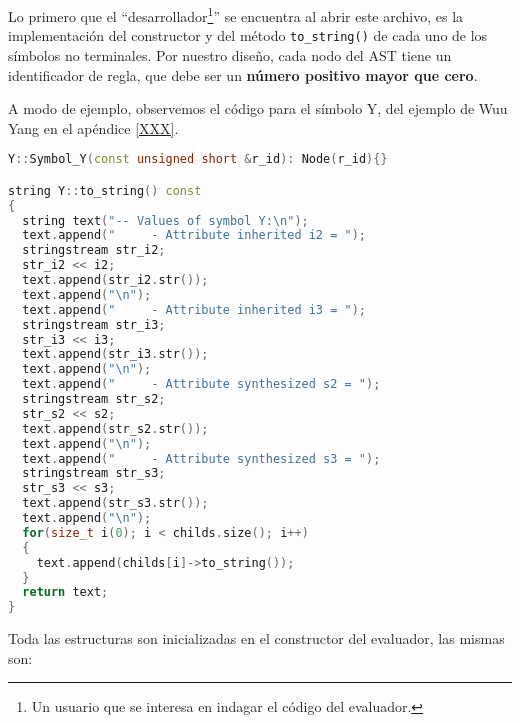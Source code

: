 Lo primero que el ``desarrollador\footnote{Un usuario que se interesa en indagar el código del evaluador.}'' se encuentra al abrir este archivo, es la implementación del constructor y del método \texttt{to\_string()} de cada uno de los símbolos no terminales. Por nuestro diseño, cada nodo del AST tiene un identificador de regla, que debe ser un \textbf{número positivo mayor que cero}.

A modo de ejemplo, observemos el código para el símbolo Y, del ejemplo de Wuu Yang en el apéndice \ref{XXX}.

\begin{lstlisting}[language=C++, basicstyle=\scriptsize, columns=fullflexible, linewidth=9cm]
Y::Symbol_Y(const unsigned short &r_id): Node(r_id){}

string Y::to_string() const
{
  string text("-- Values of symbol Y:\n");
  text.append("     - Attribute inherited i2 = ");
  stringstream str_i2;
  str_i2 << i2;
  text.append(str_i2.str());
  text.append("\n");
  text.append("     - Attribute inherited i3 = ");
  stringstream str_i3;
  str_i3 << i3;
  text.append(str_i3.str());
  text.append("\n");
  text.append("     - Attribute synthesized s2 = ");
  stringstream str_s2;
  str_s2 << s2;
  text.append(str_s2.str());
  text.append("\n");
  text.append("     - Attribute synthesized s3 = ");
  stringstream str_s3;
  str_s3 << s3;
  text.append(str_s3.str());
  text.append("\n");
  for(size_t i(0); i < childs.size(); i++)
  {
    text.append(childs[i]->to_string());
  }
  return text;
}
\end{lstlisting}

Toda las estructuras son inicializadas en el constructor del evaluador, las mismas son:


